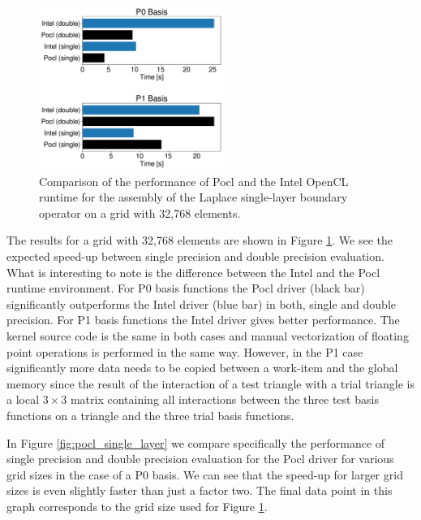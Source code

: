 \begin{figure}
	\center
	\includegraphics[width=6cm]{img/intel_pocl_laplace_comp.pdf}
	\caption{Comparison of the performance of Pocl and the Intel OpenCL runtime for the assembly of the Laplace single-layer boundary operator on a grid with 32,768 elements.}
	\label{fig:intel_pocl_laplace_cmp}
\end{figure}

The results for a grid with 32,768 elements are shown in Figure \ref{fig:intel_pocl_laplace_cmp}. We see the expected speed-up between single precision and double precision evaluation. What is interesting to note is the difference between the Intel and the Pocl runtime environment. For P0 basis functions the Pocl driver (black bar) significantly outperforms the Intel driver (blue bar) in both, single and double precision. For P1 basis functions the Intel driver gives better performance. The kernel source code is the same in both cases and manual vectorization of floating point operations is performed in the same way. However, in the P1 case significantly more data needs to be copied between a work-item and the global memory since the result of the interaction of a test triangle with a trial triangle is a local $3\times 3$ matrix containing all interactions between the three test basis functions on a triangle and the three trial basis functions. 

In Figure \ref{fig:pocl_single_layer} we compare specifically the performance of single precision and double precision evaluation for the Pocl driver for various grid sizes in the case of a P0 basis. We can see that the speed-up for larger grid sizes is even slightly faster than just a factor two. The final data point in this graph corresponds to the grid size used for Figure \ref{fig:intel_pocl_laplace_cmp}.


